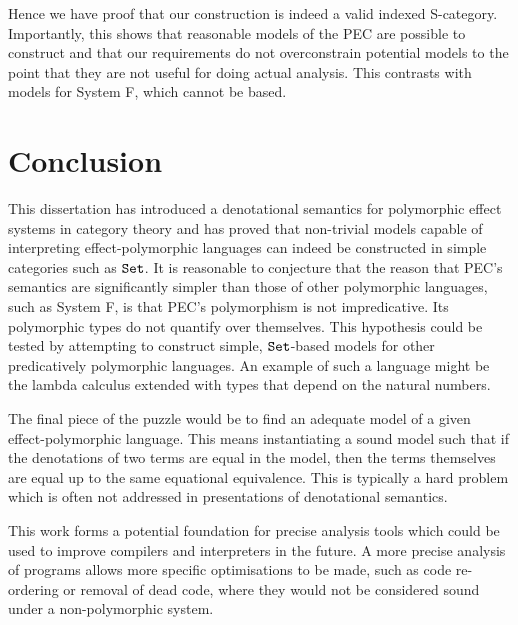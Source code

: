\documentclass{Report}
\begin{document}
Hence we have proof that our construction is indeed a valid indexed S-category. Importantly, this shows that reasonable models of the PEC are possible to construct and that our requirements do not overconstrain potential models to the point that they are not useful for doing actual analysis. This contrasts with models for System F, which cannot be \set based\cite{PolymorphismIsNotSetTheoretic}.

\chapter{Conclusion}
This dissertation has introduced a denotational semantics for polymorphic effect systems in category theory and has proved that non-trivial models capable of interpreting effect-polymorphic languages can indeed be constructed in simple categories such as $\texttt{Set}$. It is reasonable to conjecture that the reason that PEC's semantics are significantly simpler than those of other polymorphic languages, such as System F, is that PEC's polymorphism is not impredicative. Its polymorphic types do not quantify over themselves. This hypothesis could be tested by attempting to construct simple, $\texttt{Set}$-based models for other predicatively polymorphic languages. An example of such a language might be the lambda calculus extended with types that depend on the natural numbers.

The final piece of the puzzle would be to find an adequate model of a given effect-polymorphic language. This means instantiating a sound model such that if the denotations of two terms are equal in the model, then the terms themselves are equal up to the same equational equivalence. This is typically a hard problem which is often not addressed in presentations of denotational semantics.

This work forms a potential foundation for precise analysis tools which could be used to improve compilers and interpreters in the future. A more precise analysis of programs allows more specific optimisations to be made, such as code re-ordering or removal of dead code, where they would not be considered sound under a non-polymorphic system.

 




\appendix




\end{document}
